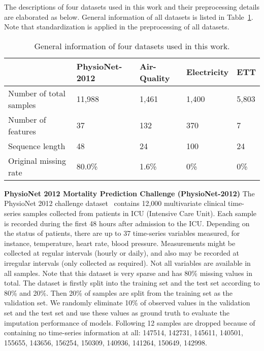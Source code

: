 \documentclass{article}
\begin{document}
The descriptions of four datasets used in this work and their preprocessing details are elaborated as below. General information of all datasets is listed in Table~\ref{dataset_info}. Note that standardization is applied in the preprocessing of all datasets.
\begin{table} [!htb]
	\caption{General information of four datasets used in this work.}
	\label{dataset_info}
	\centering
	\begin{tabular}{p{100pt}<{\centering}|p{70pt}<{\centering}|p{70pt}<{\centering}|p{70pt}<{\centering}|p{70pt}<{\centering}}
		\toprule
		& PhysioNet-2012 & Air-Quality  & Electricity & ETT \\
		\midrule
		Number of total samples&  11,988        &  1,461       & 1,400         &  5,803          \\ 
		\midrule
		Number of features     &   37           &  132         & 370                     &       7  \\
		\midrule
		Sequence length        &   48           & \phantom{0}24& 100           &  24  \\ 
		\midrule
		Original missing rate  &  80.0\%        &  1.6\%       & 0\%               &     0\%  \\ 
		\bottomrule
	\end{tabular}
\end{table}

\textbf{PhysioNet 2012 Mortality Prediction Challenge (PhysioNet-2012)} \hspace{1em} 
The PhysioNet 2012 challenge dataset~\cite{Goldberger2000PhysioNet} contains 12,000 multivariate clinical time-series samples collected from patients in ICU (Intensive Care Unit). Each sample is recorded during the first 48 hours after admission to the ICU. Depending on the status of patients, there are up to 37 time-series variables measured, for instance, temperature, heart rate, blood pressure. Measurements might be collected at regular intervals (hourly or daily), and also may be recorded at irregular intervals (only collected as required). Not all variables are available in all samples. Note that this dataset is very sparse and has 80\% missing values in total. The dataset is firstly split into the training set and the test set according to 80\% and 20\%. Then 20\% of samples are split from the training set as the validation set. We randomly eliminate 10\% of observed values in the validation set and the test set and use these values as ground truth to evaluate the imputation performance of models. Following 12 samples are dropped because of containing no time-series information at all: 147514, 142731, 145611, 140501, 155655, 143656, 156254, 150309, 140936, 141264, 150649, 142998.
\end{document}
